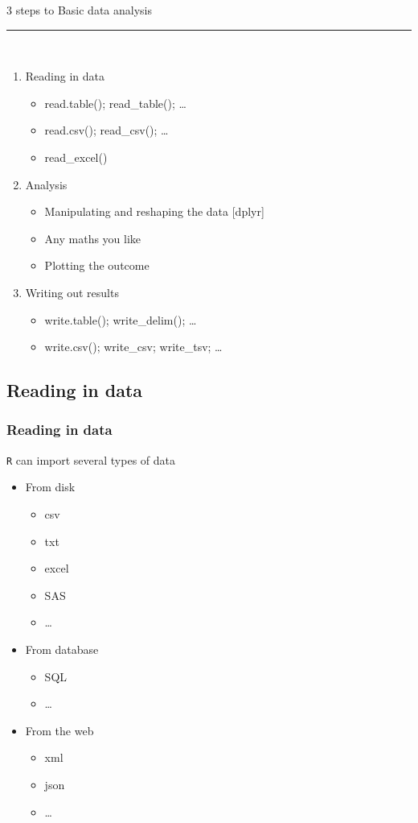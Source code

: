 \documentclass{beamer}
\begin{document}
\begin{frame}[fragile]
	\centering \LARGE 3 steps to Basic data analysis
\rule{\textwidth}{0.4pt}\\
	\begin{enumerate}
			\Large
		\item Reading in data
			\small
			\begin{itemize}
				\item read.table(); read\_table(); \ldots
				\item read.csv(); read\_csv(); \ldots
				\item read\_excel()
			\end{itemize}
			\Large
		\item Analysis 
			\small
			\begin{itemize}
				\item Manipulating and reshaping the data [dplyr]
				\item Any maths you like
				\item Plotting the outcome
			\end{itemize}
			\Large
		\item Writing out results
			\small
			\begin{itemize}
				\item write.table(); write\_delim(); \ldots
				\item write.csv(); write\_csv; write\_tsv; \ldots
			\end{itemize}
			\Large
	\end{enumerate}
\end{frame}

\subsection{Reading in data}
\begin{frame}[fragile]
	\frametitle{Reading in data}
	\centering \Large \texttt{R} can import several types of data
	\begin{itemize}
		\small
		\item From disk
			\begin{itemize}
				\scriptsize
				\item csv
				\item txt
				\item excel
				\item SAS
				\item \ldots
				\small
			\end{itemize}
		\item From database
			\begin{itemize}
				\scriptsize
				\item SQL
				\item \ldots
				\small
			\end{itemize}
		\item From the web 
			\begin{itemize}
				\scriptsize
				\item xml
				\item json
				\item \ldots
				\small
			\end{itemize}
	\end{itemize}
\end{frame}
\end{document}
